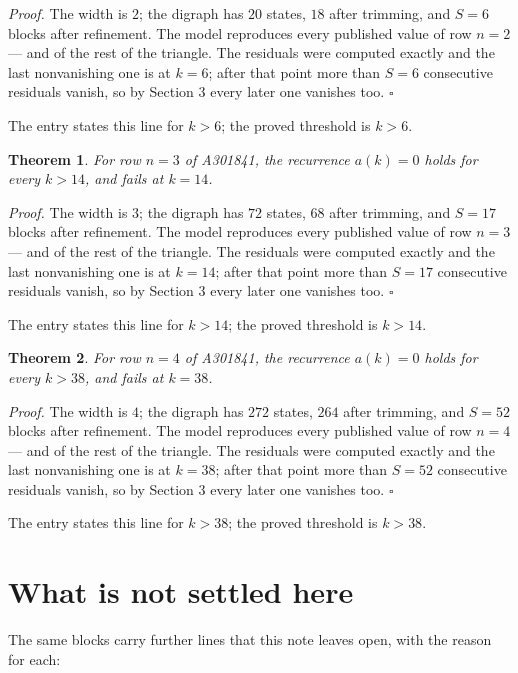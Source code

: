 \documentclass[11pt]{article}
\newtheorem{theorem}{Theorem}
\theoremstyle{definition}
\begin{document}
{\itshape Proof.} The width is $2$; the digraph has $20$ states, $18$ after trimming, and $S = 6$ blocks after refinement. The model reproduces every published value of row $n = 2$ --- and of the rest of the triangle. The residuals were computed exactly and the last nonvanishing one is at $k = 6$; after that point more than $S = 6$ consecutive residuals vanish, so by Section 3 every later one vanishes too. $\square$

The entry states this line for $k > 6$; the proved threshold is $k > 6$.

\begin{theorem} For row $n = 3$ of A301841, the recurrence $a(k) = 0$ holds for every $k > 14$, and fails at $k = 14$.\end{theorem}

{\itshape Proof.} The width is $3$; the digraph has $72$ states, $68$ after trimming, and $S = 17$ blocks after refinement. The model reproduces every published value of row $n = 3$ --- and of the rest of the triangle. The residuals were computed exactly and the last nonvanishing one is at $k = 14$; after that point more than $S = 17$ consecutive residuals vanish, so by Section 3 every later one vanishes too. $\square$

The entry states this line for $k > 14$; the proved threshold is $k > 14$.

\begin{theorem} For row $n = 4$ of A301841, the recurrence $a(k) = 0$ holds for every $k > 38$, and fails at $k = 38$.\end{theorem}

{\itshape Proof.} The width is $4$; the digraph has $272$ states, $264$ after trimming, and $S = 52$ blocks after refinement. The model reproduces every published value of row $n = 4$ --- and of the rest of the triangle. The residuals were computed exactly and the last nonvanishing one is at $k = 38$; after that point more than $S = 52$ consecutive residuals vanish, so by Section 3 every later one vanishes too. $\square$

The entry states this line for $k > 38$; the proved threshold is $k > 38$.

\section{What is not settled here}

The same blocks carry further lines that this note leaves open, with the reason for each:
\end{document}

